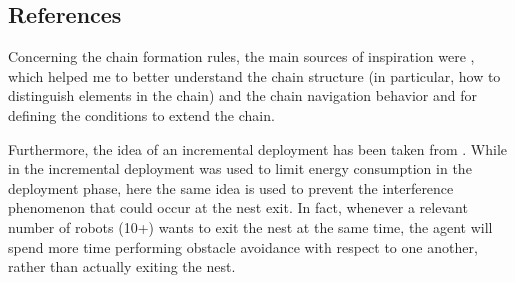\begin{center}
\end{center}



\subsection{References}

Concerning the chain formation rules, the main sources of inspiration were \cite{nouyan2004chain}, \cite{nouyan2008path} which helped me to better understand the chain structure (in particular, how to distinguish elements in the chain) and the chain navigation behavior and \cite{goss1992harvesting} for defining the conditions to extend the chain.

Furthermore, the idea of an incremental deployment has been taken from \cite{stirling2013energy}.
While in \cite{stirling2013energy} the incremental deployment was used to limit energy consumption in the deployment phase, here the same idea is used to prevent the interference phenomenon that could occur at the nest exit.
In fact, whenever a relevant number of robots (10+) wants to exit the nest at the same time, the agent will spend more time performing obstacle avoidance with respect to one another, rather than actually exiting the nest.







